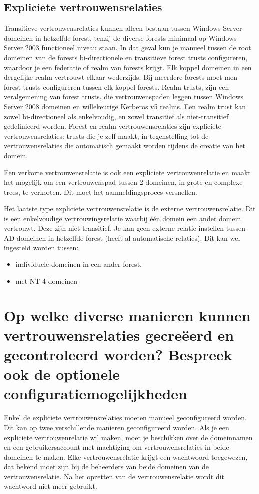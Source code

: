 \subsection{Expliciete vertrouwensrelaties}

Transitieve vertrouwensrelaties kunnen alleen bestaan tussen Windows Server
domeinen in hetzelfde forest, tenzij de diverse forests minimaal op Windows
Server 2003 functioneel niveau staan. In dat geval kun je manueel tussen de root
domeinen van de forests bi-directionele en transitieve forest trusts
configureren, waardoor je een federatie of realm van forests krijgt. Elk koppel
domeinen in een dergelijke realm vertrouwt elkaar wederzijds. Bij meerdere
forests moet men forest trusts configureren tussen elk koppel forests.
Realm trusts, zijn een veralgemening van forest trusts, die vertrouwenspaden
leggen tussen Windows Server 2008 domeinen en willekeurige Kerberos v5 realms.
Een realm trust kan zowel bi-directioneel als enkelvoudig, en zowel transitief
als niet-transitief gedefinieerd worden.
Forest en realm vertrouwensrelaties zijn expliciete vertrouwensrelaties: trusts
die je zelf maakt, in tegenstelling tot de vertrouwensrelaties die automatisch
gemaakt worden tijdens de creatie van het domein.

Een verkorte vertrouwensrelatie is ook een expliciete vertrouwenrelatie en
maakt het mogelijk om een vertrouwenspad tussen 2 domeinen, in grote en complexe
trees, te verkorten. Dit moet het aanmeldingsproces versnellen.

Het laatste type expliciete vertrouwensrelatie is de externe vertrouwensrelatie.
Dit is een enkelvoudige vertrouwingsrelatie waarbij één domein een ander domein
vertrouwt. Deze zijn niet-transitief. Je kan geen externe relatie instellen
tussen AD domeinen in hetzelfde forest (heeft al automatische relaties). Dit kan
wel ingesteld worden tussen:
\begin{itemize}
	\item individuele domeinen in een ander forest.
	\item met NT 4 domeinen
\end{itemize}

\section{Op welke diverse manieren kunnen vertrouwensrelaties gecreëerd en
gecontroleerd worden? Bespreek ook de optionele configuratiemogelijkheden}

Enkel de expliciete vertrouwensrelaties moeten manueel geconfigureerd worden.
Dit kan op twee verschillende manieren geconfigureerd worden. Als je een
expliciete vertrouwenrelatie wil maken, moet je beschikken over de domeinnamen
en een gebruikersaccount met machtiging om vertrouwensrelaties in beide domeinen
te maken. Elke vertrouwensrelatie krijgt een wachtwoord toegewezen, dat bekend
moet zijn bij de beheerders van beide domeinen van de vertrouwensrelatie. Na het
opzetten van de vertrouwensrelatie wordt dit wachtword niet meer gebruikt.

